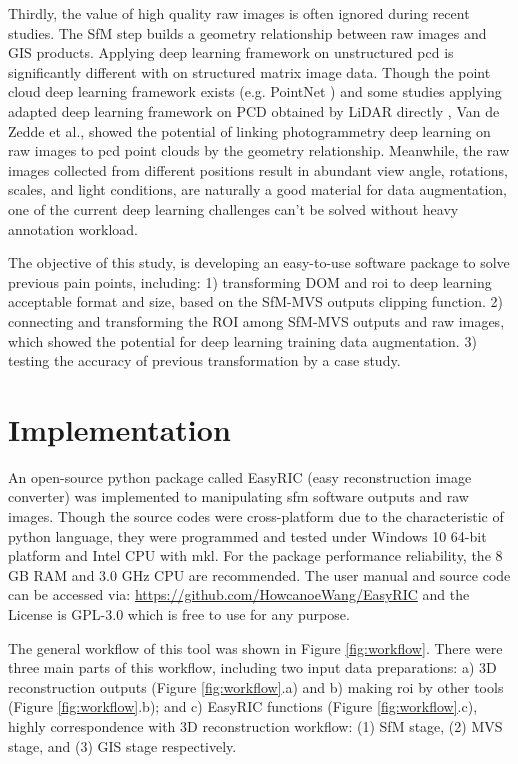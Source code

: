 \documentclass{configs/bmcart}
\begin{document}
Thirdly, the value of high quality raw images is often ignored during recent studies. The SfM step  builds a geometry relationship between raw images and GIS products. Applying deep learning framework on unstructured \acrfull*{pcd} is significantly different with on structured matrix image data. Though the point cloud deep learning framework exists (e.g. PointNet \cite{qi_pointnet_2017}) and some studies applying adapted deep learning framework on PCD obtained by LiDAR directly \cite{jin_deep_2018, jin_stemleaf_2019, jin_non-destructive_2020}, Van de Zedde et al., \cite{van_de_zedde_plant-part_2019} showed the potential of linking photogrammetry deep learning on raw images to \acrfull*{pcd} point clouds by the geometry relationship. Meanwhile, the raw images collected from different positions result in abundant view angle, rotations, scales, and light conditions, are naturally a good material for data augmentation, one of the current deep learning challenges can't be solved without heavy annotation workload.

The objective of this study, is developing an easy-to-use software package to solve previous pain points, including: 1) transforming DOM and \acrfull*{roi} to deep learning acceptable format and size, based on the SfM-MVS outputs clipping function. 2) connecting and transforming the ROI among SfM-MVS outputs and raw images, which showed the potential for deep learning training data augmentation. 3) testing the accuracy of previous transformation by a case study.

\section*{Implementation}

An open-source python package called EasyRIC (easy reconstruction image converter) was implemented to manipulating \acrshort*{sfm} software outputs and raw images. Though the source codes were cross-platform due to the characteristic of python language, they were programmed and tested under Windows 10 64-bit platform and Intel CPU with \acrfull*{mkl}. For the package performance reliability, the 8 GB RAM and 3.0 GHz CPU are recommended. The user manual and source code can be accessed via: \url{https://github.com/HowcanoeWang/EasyRIC} and the License is GPL-3.0 which is free to use for any purpose.

The general workflow of this tool was shown in Figure \ref{fig:workflow}. There were three main parts of this workflow, including two input data preparations: a) 3D reconstruction outputs (Figure \ref{fig:workflow}.a) and b) making \acrfull*{roi} by other tools (Figure \ref{fig:workflow}.b); and c) EasyRIC functions (Figure \ref{fig:workflow}.c), highly correspondence with 3D reconstruction workflow: (1) SfM stage, (2) MVS stage, and (3) GIS stage respectively. 
\end{document}
